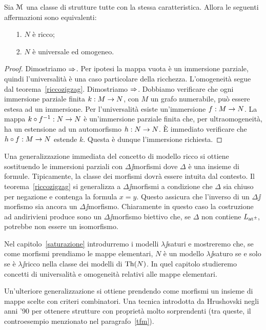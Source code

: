 \begin{theorem}\label{ricco<->universaleomogeneo}
Sia $\EuScript M$ una classe di strutture tutte con la stessa caratteristica. Allora le seguenti affermazioni sono equivalenti:
\begin{itemize}
\item[1.] $N$ \`e ricco;
\item[2.] $N$ \`e universale ed omogeneo.
\end{itemize}
\end{theorem}
\begin{proof} 
Dimostriamo $\Rightarrow$. Per ipotesi la mappa vuota \`e un immersione parziale, quindi l'universalit\`a \`e una caso particolare della ricchezza. L'omogeneit\`a segue dal teorema~\ref{riccozigzag}. Dimostriamo $\Rightarrow$. Dobbiamo verificare che ogni immersione parziale finita $k:M\rightarrow N$, con $M$ un grafo numerabile, pu\`o essere estesa ad un immersione. Per l'universalit\`a esiste un'immersione $f:M\rightarrow N$. La mappa $k\circ f^{-1}:N\rightarrow N$ \`e un'immersione parziale finita che, per ultraomogeneit\`a, ha un estensione ad un automorfismo $h:N\rightarrow N$. \`E immediato verificare che $h\circ f:M\rightarrow N$ estende $k$. Questa \`e dunque l'immersione richiesta.
\end{proof}

Una generalizzazione immediata del concetto di modello ricco si ottiene sostituendo le immersioni parziali con $\Delta\jj$morfismi dove $\Delta$ \`e una insieme di formule. Tipicamente, la classe dei morfismi dovr\`a essere intuita dal contesto. Il teorema~\ref{riccozigzag} si generalizza a $\Delta\jj$morfismi a condizione che $\Delta$ sia chiuso per negazione e contenga la formula $x=y$. Questo assicura che l'inverso di un $\Delta\jj$morfismo sia ancora un $\Delta\jj$morfismo. Chiaramente in questo caso la costruzione ad andirivieni produce sono un $\Delta\jj$morfismo biettivo che, se $\Delta$ non contiene $L_{{\tiny\rm at^\pm}}\hskip-.3ex$, potrebbe non essere un isomorfismo.  

Nel capitolo~\ref{saturazione} introdurremo i modelli $\lambda\jj$saturi e mostreremo che, se come morfismi prendiamo le mappe elementari, $N$ \`e un modello $\lambda\jj$saturo se e solo se \`e $\lambda\jj$ricco nella classe dei modelli di $\textrm{Th}(N)$. In quel capitolo studieremo concetti di universalit\`a e omogeneit\`a relativi alle mappe elementari.

Un'ulteriore generalizzazione si ottiene prendendo come morfismi un insieme di mappe scelte con criteri combinatori. Una tecnica introdotta da Hrushovski negli anni '90 per ottenere strutture con propriet\`a molto sorprendenti (tra queste, il controesempio menzionato nel paragrafo~\ref{tfm}). 


